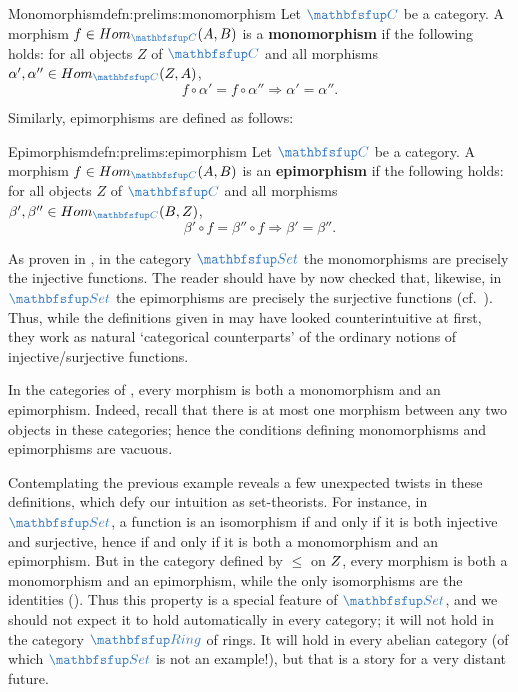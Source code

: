 \begin{defn}{Monomorphism}{defn:prelims:monomorphism}
  Let $\categ{C}$ be a category. A morphism
  $f \in \Hom_{\categ{C}}(A,B)$ is a \textbf{monomorphism} if the
  following holds: for all objects $Z$ of $\categ{C}$ and all
  morphisms $\alpha', \alpha'' \in \Hom_{\categ{C}}(Z,A)$,
  \[
    f \circ \alpha' = f \circ \alpha'' \Rightarrow \alpha' = \alpha''.
  \]
\end{defn}

Similarly, epimorphisms are defined as follows:

\begin{defn}{Epimorphism}{defn:prelims:epimorphism}
  Let $\categ{C}$ be a category. A morphism
  $f \in \Hom_{\categ{C}}(A,B)$ is an \textbf{epimorphism} if the
  following holds: for all objects $Z$ of $\categ{C}$ and all
  morphisms $\beta', \beta'' \in \Hom_{\categ{C}}(B,Z)$,
  \[
    \beta' \circ f = \beta'' \circ f \Rightarrow \beta' = \beta''.
  \]
\end{defn}

\begin{exam}{}{}
  As proven in , in the
  category $\categ{Set}$ the monomorphisms are precisely the injective
  functions. The reader should have by now checked that, likewise, in
  $\categ{Set}$ the epimorphisms are precisely the surjective
  functions (cf.\ ). Thus, while
  the definitions given in
  may have looked counterintuitive at first, they work as natural
  `categorical counterparts' of the ordinary notions of
  injective/surjective functions.
\end{exam}

\begin{exam}{}{}
  In the categories of , every
  morphism is both a monomorphism and an epimorphism. Indeed, recall
  that there is at most one morphism between any two objects in these
  categories; hence the conditions defining monomorphisms and
  epimorphisms are vacuous.
\end{exam}

Contemplating the previous example reveals a few unexpected twists in
these definitions, which defy our intuition as set-theorists. For
instance, in $\categ{Set}$, a function is an isomorphism if and only
if it is both injective and surjective, hence if and only if it is
both a monomorphism and an epimorphism. But in the category defined by
$\leq$ on $Z$, every morphism is both a monomorphism and an
epimorphism, while the only isomorphisms are the identities
(). Thus this property is a special
feature of $\categ{Set}$, and we should not expect it to hold
automatically in every category; it will not hold in the category
$\categ{Ring}$ of rings. It will hold in every abelian category (of
which $\categ{Set}$ is not an example!), but that is a story for a
very distant future.

